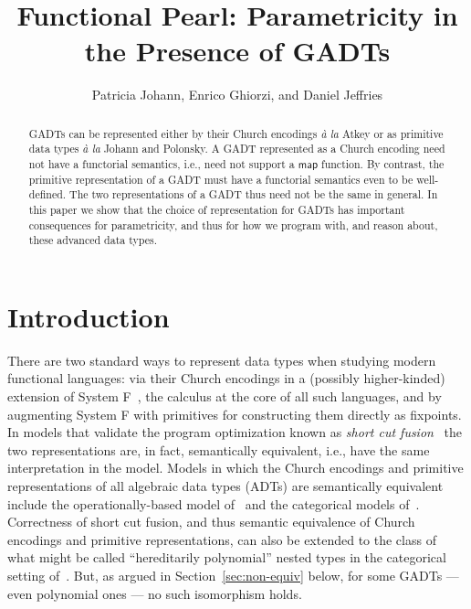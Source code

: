 \documentclass[acmsmall,screen,review,anonymous]{acmart}
\title[Functional Pearl: Parametricity in the Presence of
  GADTs]{Functional Pearl: Parametricity in the Presence of GADTs}
\author{Patricia Johann, Enrico Ghiorzi, and Daniel Jeffries}
\affiliation{ \institution{Appalachian State University}}
\theoremstyle{definition}
\begin{document}
\begin{abstract}
GADTs can be represented either by their Church encodings {\em \`a la}
Atkey or as primitive data types {\em \`a la} Johann and Polonsky.  A
GADT represented as a Church encoding need not have a functorial
semantics, i.e., need not support a $\mathsf{map}$ function. By
contrast, the primitive representation of a GADT must have a
functorial semantics even to be well-defined. The two representations
of a GADT thus need not be the same in general. In this paper we show
that the choice of representation for GADTs has important consequences
for parametricity, and thus for how we program with, and reason about,
these advanced data types.
\end{abstract}

\maketitle

\section{Introduction}\label{sec:intro}

There are two standard ways to represent data types when studying
modern functional languages: via their Church encodings in a (possibly
higher-kinded) extension of System F~\cite{gir72}, the calculus at the
core of all such languages, and by augmenting System F
with primitives for constructing them directly as fixpoints.
In models that validate the program optimization known as {\em short
  cut fusion}~\cite{glp93} the two representations are, in fact,
semantically equivalent, i.e., have the same interpretation in the
model. Models in which the Church encodings and primitive
representations of all algebraic data types (ADTs) are semantically
equivalent include the operationally-based model of~\cite{pit98,pit00}
and the categorical models of~\cite{joh02,joh03}.
Correctness of short cut fusion, and thus semantic equivalence of
Church encodings and primitive representations, can also be extended
to the class of what might be called ``hereditarily polynomial''
nested types in the categorical setting of~\cite{jgj21}. But, as argued
in Section~\ref{sec:non-equiv} below, for some GADTs --- even polynomial
ones --- no such isomorphism holds.
\end{document}
